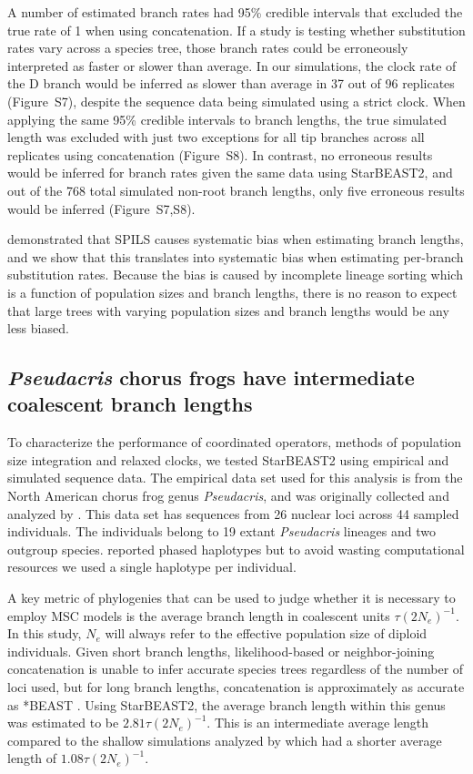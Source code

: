 \documentclass[nogrid]{MBE}%
\begin{document}
A number of estimated branch rates had 95\% credible intervals that excluded
the true rate of 1 when using concatenation. If a study is testing whether
substitution rates vary across a species tree, those branch rates could be
erroneously interpreted as faster or slower than average. In our simulations,
the clock rate of the D branch would be inferred as slower than average in 37
out of 96 replicates (Figure~S7), despite the sequence data being simulated
using a strict clock. When applying the same 95\% credible intervals to branch
lengths, the true simulated length was excluded with just two exceptions for
all tip branches across all replicates using concatenation (Figure~S8). In
contrast, no erroneous results would be inferred for branch rates given the
same data using StarBEAST2, and out of the 768 total simulated non-root branch
lengths, only five erroneous results would be inferred (Figure~S7,S8).

\cite{Mendes01072016} demonstrated that SPILS causes systematic bias when
estimating branch lengths, and we show that this translates into systematic
bias when estimating per-branch substitution rates. Because the bias is caused
by incomplete lineage sorting which is a function of population sizes and
branch lengths, there is no reason to expect that large trees with varying
population sizes and branch lengths would be any less biased.

\subsection{\textit{Pseudacris} chorus frogs have intermediate coalescent branch lengths}

To characterize the performance of coordinated operators, methods of
population size integration and relaxed clocks, we tested StarBEAST2 using
empirical and simulated sequence data. The empirical data set used for this
analysis is from the North American chorus frog genus \textit{Pseudacris}, and
was originally collected and analyzed by \cite{Barrow201478}. This data set
has sequences from 26 nuclear loci across 44 sampled individuals. The individuals
belong to 19 extant \textit{Pseudacris} lineages and two outgroup species.
\cite{Barrow201478} reported phased haplotypes but to avoid wasting
computational resources we used a single haplotype per individual.

A key metric of phylogenies that can be used to judge whether it is necessary
to employ MSC models is the average branch length in coalescent units
$\tau(2N_e)^{-1}$. In this study, $N_e$ will always refer to the
effective population size of diploid individuals. Given short branch lengths,
likelihood-based or neighbor-joining concatenation is unable to infer accurate
species trees regardless of the number of loci used, but for long branch
lengths, concatenation is approximately as accurate as *BEAST
\citep{Ogilvie01052016}. Using StarBEAST2, the average branch length within
this genus was estimated to be $2.81\tau(2N_e)^{-1}$. This is an
intermediate average length compared to the shallow simulations analyzed by
\cite{Ogilvie01052016} which had a shorter average length of
$1.08\tau(2N_e)^{-1}$.
\end{document}
